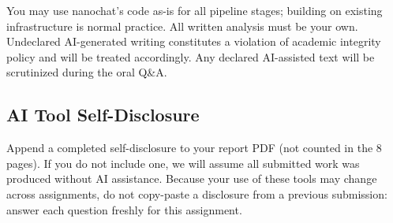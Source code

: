 You may use nanochat's code as-is for all pipeline stages; building on existing infrastructure is normal practice. All written analysis must be your own. Undeclared AI-generated writing constitutes a violation of academic integrity policy and will be treated accordingly. Any declared AI-assisted text will be scrutinized during the oral Q\&A.

\subsection*{AI Tool Self-Disclosure}

Append a completed self-disclosure to your report PDF (not counted in the 8 pages). If you do not include one, we will assume all submitted work was produced without AI assistance. Because your use of these tools may change across assignments, do not copy-paste a disclosure from a previous submission: answer each question freshly for this assignment.

